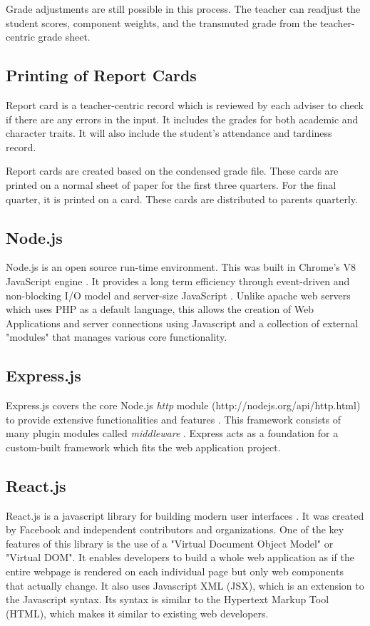 \documentclass[11pt,a4paper,titlepage]{article}
\begin{document}
Grade adjustments are still possible in this process. The teacher can readjust the student scores, component weights, and the transmuted grade from the teacher-centric grade sheet.

\subsection{Printing of Report Cards}

Report card is a teacher-centric record which is reviewed by each adviser to check if there are any errors in the input. It includes the grades for both academic and character traits. It will also include the student's attendance and tardiness record.

Report cards are created based on the condensed grade file. These cards are printed on a normal sheet of paper for the first three quarters. For the final quarter, it is printed on a card. These cards are distributed to parents quarterly.

\subsection{Node.js}

Node.js is an open source run-time environment. This was built in Chrome's V8 JavaScript engine \cite{Shah}. It provides a long term efficiency through event-driven and non-blocking I/O model and server-size JavaScript \cite{Joyent}. Unlike apache web servers which uses PHP as a default language, this allows the creation of Web Applications and server connections using Javascript and a collection of external "modules" that manages various core functionality.  

\subsection{Express.js}

Express.js covers the core Node.js \textit{http} module (http://nodejs.org/api/http.html) to provide extensive functionalities and features \cite{Mardan}. This framework consists of many plugin modules called \textit{middleware} \cite{Mardan}. Express acts as a foundation for a custom-built framework which fits the web application project.

\subsection{React.js}

React.js is a javascript library for building modern user interfaces \cite{Nahar}. It was created by Facebook and independent contributors and organizations. One of the key features of this library is the use of a "Virtual Document Object Model" or "Virtual DOM". It enables developers to build a whole web application as if the entire webpage is rendered on each individual page but only web components that actually change. It also uses Javascript XML (JSX), which is an extension to the Javascript syntax. Its syntax is similar to the Hypertext Markup Tool (HTML), which makes it similar to existing web developers.
\end{document}
